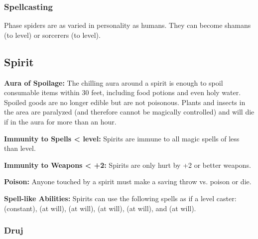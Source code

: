 \begin{multicols*}{2}
\subsubsection{Spellcasting}
Phase spiders are as varied in personality as humans. They can become shamans (to  level) or sorcerers (to  level).

\subsection{Spirit}
\textbf{Aura of Spoilage:} The chilling aura around a spirit is enough to spoil consumable items within 30 feet, including food potions and even holy water. Spoiled goods are no longer edible but are not poisonous. Plants and insects in the area are paralyzed (and therefore cannot be magically controlled) and will die if in the aura for more than an hour.

\textbf{Immunity to Spells <  level:} Spirits are immune to all magic spells of less than  level.

\textbf{Immunity to Weapons < +2:} Spirits are only hurt by +2 or better weapons.

\textbf{Poison:} Anyone touched by a spirit must make a saving throw vs. poison or die.

\textbf{Spell-like Abilities:} Spirits can use the following spells as if a  level caster:  (constant),  (at will),  (at will),  (at will),  (at will), and  (at will).

\subsubsection{Druj}
\end{multicols*}
